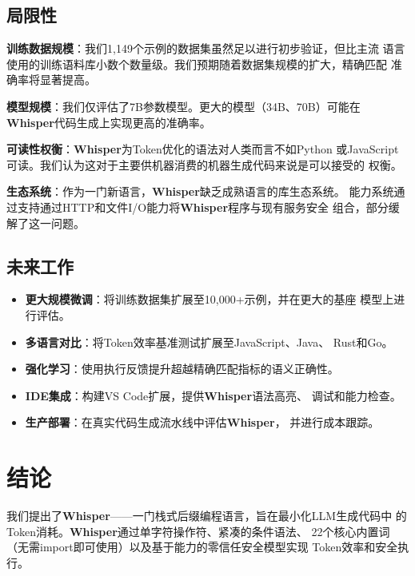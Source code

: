 \documentclass[11pt,a4paper]{ctexart}
\begin{document}
\subsection{局限性}

\textbf{训练数据规模}：我们1,149个示例的数据集虽然足以进行初步验证，但比主流
语言使用的训练语料库小数个数量级。我们预期随着数据集规模的扩大，精确匹配
准确率将显著提高。

\textbf{模型规模}：我们仅评估了7B参数模型。更大的模型（34B、70B）可能在
\textbf{Whisper}代码生成上实现更高的准确率。

\textbf{可读性权衡}：\textbf{Whisper}为Token优化的语法对人类而言不如Python
或JavaScript可读。我们认为这对于主要供机器消费的机器生成代码来说是可以接受的
权衡。

\textbf{生态系统}：作为一门新语言，\textbf{Whisper}缺乏成熟语言的库生态系统。
能力系统通过支持通过HTTP和文件I/O能力将\textbf{Whisper}程序与现有服务安全
组合，部分缓解了这一问题。

\subsection{未来工作}

\begin{itemize}
\item \textbf{更大规模微调}：将训练数据集扩展至10,000+示例，并在更大的基座
  模型上进行评估。
\item \textbf{多语言对比}：将Token效率基准测试扩展至JavaScript、Java、
  Rust和Go。
\item \textbf{强化学习}：使用执行反馈提升超越精确匹配指标的语义正确性。
\item \textbf{IDE集成}：构建VS Code扩展，提供\textbf{Whisper}语法高亮、
  调试和能力检查。
\item \textbf{生产部署}：在真实代码生成流水线中评估\textbf{Whisper}，
  并进行成本跟踪。
\end{itemize}

\section{结论}
\label{sec:conclusion}

我们提出了\textbf{Whisper}——一门栈式后缀编程语言，旨在最小化LLM生成代码中
的Token消耗。\textbf{Whisper}通过单字符操作符、紧凑的条件语法、
22个核心内置词（无需import即可使用）以及基于能力的零信任安全模型实现
Token效率和安全执行。
\end{document}

